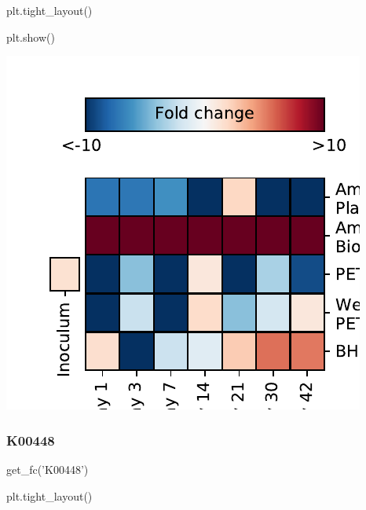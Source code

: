 \documentclass[
]{article}
\newenvironment{Shaded}{\begin{snugshade}}{\end{snugshade}}
\newcommand{\NormalTok}[1]{#1}
\newcommand{\StringTok}[1]{\textcolor[rgb]{0.31,0.60,0.02}{#1}}
\begin{document}
\begin{Shaded}
\begin{Highlighting}[]
\NormalTok{plt.tight_layout()}
\end{Highlighting}
\end{Shaded}

\begin{Shaded}
\begin{Highlighting}[]
\NormalTok{plt.show()}
\end{Highlighting}
\end{Shaded}

\includegraphics{20-6-15-PET-plastisphere-PICRUSt2_files/figure-latex/plot_fc_tphB-1.pdf}

\hypertarget{k00448-1}{%
\subsubsection{K00448}\label{k00448-1}}

\begin{Shaded}
\begin{Highlighting}[]
\NormalTok{get_fc(}\StringTok{'K00448'}\NormalTok{)}
\end{Highlighting}
\end{Shaded}

\begin{Shaded}
\begin{Highlighting}[]
\NormalTok{plt.tight_layout()}
\end{Highlighting}
\end{Shaded}
\end{document}
